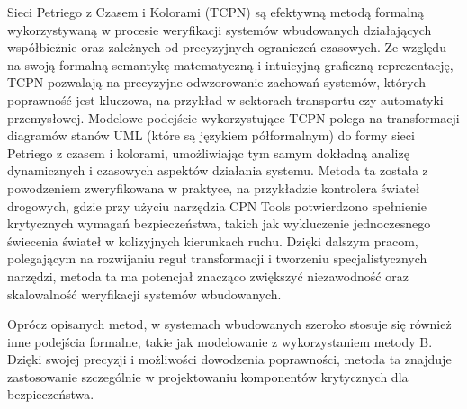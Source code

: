 \documentclass[conference]{IEEEtran}
\begin{document}
    Sieci Petriego z Czasem i Kolorami (TCPN) są efektywną metodą formalną wykorzystywaną w procesie weryfikacji systemów wbudowanych działających współbieżnie oraz zależnych od precyzyjnych ograniczeń czasowych. Ze względu na swoją formalną semantykę matematyczną i intuicyjną graficzną reprezentację,
    TCPN pozwalają na precyzyjne odwzorowanie zachowań systemów, których poprawność jest kluczowa, na przykład w sektorach transportu czy automatyki przemysłowej. 
    Modelowe podejście wykorzystujące TCPN polega na transformacji diagramów stanów UML (które są językiem półformalnym) do formy sieci Petriego z czasem i kolorami, 
    umożliwiając tym samym dokładną analizę dynamicznych i czasowych aspektów działania systemu. Metoda ta została z powodzeniem zweryfikowana w praktyce,
    na przykładzie kontrolera świateł drogowych, gdzie przy użyciu narzędzia CPN Tools potwierdzono spełnienie krytycznych wymagań bezpieczeństwa, 
    takich jak wykluczenie jednoczesnego świecenia świateł w kolizyjnych kierunkach ruchu. Dzięki dalszym pracom, polegającym na rozwijaniu reguł transformacji i tworzeniu specjalistycznych narzędzi,
    metoda ta ma potencjał znacząco zwiększyć niezawodność oraz skalowalność weryfikacji systemów wbudowanych.

    Oprócz opisanych metod, w systemach wbudowanych szeroko stosuje się również inne podejścia formalne, takie jak modelowanie z wykorzystaniem metody B. Dzięki swojej precyzji i możliwości dowodzenia poprawności, 
    metoda ta znajduje zastosowanie szczególnie w projektowaniu komponentów krytycznych dla bezpieczeństwa.
\end{document}
